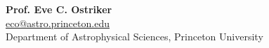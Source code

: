 \documentclass[12pt]{article}
\begin{document}


{{\bf Prof. Eve C. Ostriker} \\
\url{eco@astro.princeton.edu}\\
Department of Astrophysical Sciences, Princeton University}






\end{document}
